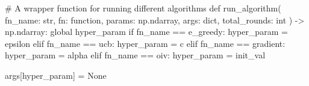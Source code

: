 \documentclass[
  letterpaper,
]{krantz}
\makeatletter
\newenvironment{Shaded}{\begin{snugshade}}{\end{snugshade}}
\newcommand{\BuiltInTok}[1]{\textcolor[rgb]{0.00,0.23,0.31}{#1}}
\newcommand{\CommentTok}[1]{\textcolor[rgb]{0.37,0.37,0.37}{#1}}
\newcommand{\ControlFlowTok}[1]{\textcolor[rgb]{0.00,0.23,0.31}{#1}}
\newcommand{\KeywordTok}[1]{\textcolor[rgb]{0.00,0.23,0.31}{#1}}
\newcommand{\NormalTok}[1]{\textcolor[rgb]{0.00,0.23,0.31}{#1}}
\newcommand{\OperatorTok}[1]{\textcolor[rgb]{0.37,0.37,0.37}{#1}}
\newcommand{\StringTok}[1]{\textcolor[rgb]{0.13,0.47,0.30}{#1}}
\newcommand{\VariableTok}[1]{\textcolor[rgb]{0.07,0.07,0.07}{#1}}
\newenvironment{kframe}{%
\medskip{}
\setlength{\fboxsep}{.8em}
 \def\at@end@of@kframe{}%
 \ifinner\ifhmode%
  \def\at@end@of@kframe{\end{minipage}}%
  \begin{minipage}{\columnwidth}%
 \fi\fi%
 \def\FrameCommand##1{\hskip\@totalleftmargin \hskip-\fboxsep
 \colorbox{shadecolor}{##1}\hskip-\fboxsep
     \hskip-\linewidth \hskip-\@totalleftmargin \hskip\columnwidth}%
 \MakeFramed {\advance\hsize-\width
   \@totalleftmargin\z@ \linewidth\hsize
   \@setminipage}}%
 {\par\unskip\endMakeFramed%
 \at@end@of@kframe}
\renewenvironment{Shaded}{\begin{kframe}}{\end{kframe}}
\theoremstyle{plain}
\theoremstyle{definition}
\theoremstyle{definition}
\theoremstyle{remark}
\makeatother
\begin{document}
\begin{codelisting}
\begin{Shaded}
\begin{Highlighting}[]
\CommentTok{\# A wrapper function for running different algorithms}
\KeywordTok{def}\NormalTok{ run\_algorithm(}
\NormalTok{        fn\_name: }\BuiltInTok{str}\NormalTok{,}
\NormalTok{        fn: }\StringTok{\textquotesingle{}function\textquotesingle{}}\NormalTok{,}
\NormalTok{        params: np.ndarray,}
\NormalTok{        args: }\BuiltInTok{dict}\NormalTok{,}
\NormalTok{        total\_rounds: }\BuiltInTok{int}
\NormalTok{        ) }\OperatorTok{{-}\textgreater{}}\NormalTok{ np.ndarray:}
    \KeywordTok{global}\NormalTok{ hyper\_param}
    \ControlFlowTok{if}\NormalTok{ fn\_name }\OperatorTok{==} \StringTok{\textquotesingle{}e\_greedy\textquotesingle{}}\NormalTok{:}
\NormalTok{        hyper\_param }\OperatorTok{=} \StringTok{\textquotesingle{}epsilon\textquotesingle{}}
    \ControlFlowTok{elif}\NormalTok{ fn\_name }\OperatorTok{==} \StringTok{\textquotesingle{}ucb\textquotesingle{}}\NormalTok{:}
\NormalTok{        hyper\_param }\OperatorTok{=} \StringTok{\textquotesingle{}c\textquotesingle{}}
    \ControlFlowTok{elif}\NormalTok{ fn\_name }\OperatorTok{==} \StringTok{\textquotesingle{}gradient\textquotesingle{}}\NormalTok{:}
\NormalTok{        hyper\_param }\OperatorTok{=} \StringTok{\textquotesingle{}alpha\textquotesingle{}}
    \ControlFlowTok{elif}\NormalTok{ fn\_name }\OperatorTok{==} \StringTok{\textquotesingle{}oiv\textquotesingle{}}\NormalTok{:}
\NormalTok{        hyper\_param }\OperatorTok{=} \StringTok{\textquotesingle{}init\_val\textquotesingle{}}
    
\NormalTok{    args[hyper\_param] }\OperatorTok{=} \VariableTok{None}
    

\end{Highlighting}
\end{Shaded}
\end{codelisting}
\end{document}
